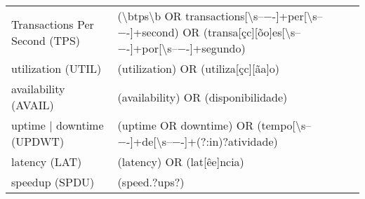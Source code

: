 \begin{table}
\begin{tabular}{ll}
Transactions Per Second (TPS) & (\textbackslash btps\textbackslash b OR transactions[\textbackslash s–−-]+per[\textbackslash s–−-]+second) OR (transa[çc][õo]es[\textbackslash s–−-]+por[\textbackslash s–−-]+segundo) \\
utilization (UTIL) & (utilization) OR (utiliza[çc][ãa]o) \\
availability (AVAIL) & (availability) OR (disponibilidade) \\
uptime | downtime (UPDWT) & (uptime OR downtime) OR (tempo[\textbackslash s–−-]+de[\textbackslash s–−-]+(?:in)?atividade) \\
latency (LAT) & (latency) OR (lat[êe]ncia) \\
speedup (SPDU) & (speed.?ups?) \\
\end{tabular}
\end{table}
